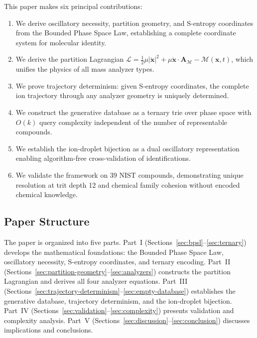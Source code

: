 \documentclass[11pt,twocolumn,a4paper]{article}
\theoremstyle{definition}
\theoremstyle{remark}
\newcommand{\Depth}{\mathcal{M}}
\newcommand{\partinert}{\mu}
\newcommand{\Apartition}{\mathbf{A}_{\mathcal{M}}}
\newcommand{\Lagr}{\mathcal{L}}
\begin{document}
This paper makes six principal contributions:
\begin{enumerate}[label=(\roman*)]
  \item We derive oscillatory necessity, partition geometry, and S-entropy coordinates from the Bounded Phase Space Law, establishing a complete coordinate system for molecular identity.
  \item We derive the partition Lagrangian $\Lagr = \tfrac{1}{2}\partinert |\dot{\mathbf{x}}|^2 + \partinert \dot{\mathbf{x}} \cdot \Apartition - \Depth(\mathbf{x},t)$, which unifies the physics of all mass analyzer types.
  \item We prove trajectory determinism: given S-entropy coordinates, the complete ion trajectory through any analyzer geometry is uniquely determined.
  \item We construct the generative database as a ternary trie over phase space with $O(k)$ query complexity independent of the number of representable compounds.
  \item We establish the ion-droplet bijection as a dual oscillatory representation enabling algorithm-free cross-validation of identifications.
  \item We validate the framework on 39 NIST compounds, demonstrating unique resolution at trit depth 12 and chemical family cohesion without encoded chemical knowledge.
\end{enumerate}

\subsection{Paper Structure}
\label{sec:paper-structure}

The paper is organized into five parts. Part~I (Sections~\ref{sec:bpsl}--\ref{sec:ternary}) develops the mathematical foundations: the Bounded Phase Space Law, oscillatory necessity, S-entropy coordinates, and ternary encoding. Part~II (Sections~\ref{sec:partition-geometry}--\ref{sec:analyzers}) constructs the partition Lagrangian and derives all four analyzer equations. Part~III (Sections~\ref{sec:trajectory-determinism}--\ref{sec:empty-database}) establishes the generative database, trajectory determinism, and the ion-droplet bijection. Part~IV (Sections~\ref{sec:validation}--\ref{sec:complexity}) presents validation and complexity analysis. Part~V (Sections~\ref{sec:discussion}--\ref{sec:conclusion}) discusses implications and conclusions.

\end{document}
